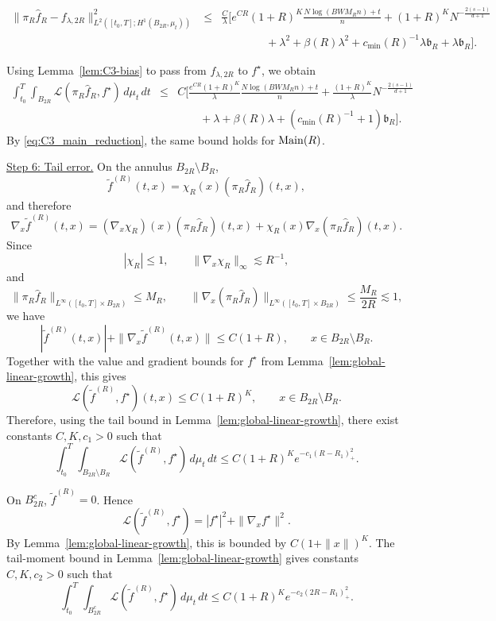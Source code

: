 \documentclass[11pt]{article}
\theoremstyle{plain}
\theoremstyle{definition}
\theoremstyle{remark}
\newcommand{\proofstep}[1]{\par\medskip\noindent\uline{#1}}
\begin{document}
\begin{eqnarray*}
\|\pi_R\widehat f_R-f_{\lambda,2R}\|_{L^2([t_0,T];H^1(B_{2R},\mu_t))}^2&\leq&
\frac{C}{\lambda}
\Big[
e^{CR}(1+R)^K\frac{N\log(BWM_Rn)+t}{n}
+
(1+R)^KN^{-\frac{2(s-1)}{d+1}}
\\
&&\qquad \qquad  +
\lambda^2+
\beta(R)\lambda^2
+
c_{\min}(R)^{-1}\lambda\mathfrak b_R
+
\lambda\mathfrak b_R
\Big].
\end{eqnarray*}

Using Lemma~\ref{lem:C3-bias} to pass from \(f_{\lambda,2R}\) to
\(f^\star\), we obtain
\begin{eqnarray}
\label{eq:C3_main_cylinder_bound_new}
\int_{t_0}^T\int_{B_{2R}}
\mathcal L(\pi_R\widehat f_R,f^\star)\,d\mu_t\,dt&\le&
C\Big[
\frac{e^{CR}(1+R)^K}{\lambda}
\frac{N\log(BWM_Rn)+t}{n}
+
\frac{(1+R)^K}{\lambda}
N^{-\frac{2(s-1)}{d+1}}\nonumber\\
&&\qquad +
\lambda
+
\beta(R)\lambda
+
(c_{\min}(R)^{-1}+1)\mathfrak b_R
\Big].
\end{eqnarray}
By \eqref{eq:C3_main_reduction}, the same bound holds for
\({\rm Main}(R)\).

\proofstep{Step 6: Tail error.}
On the annulus \(B_{2R}\setminus B_R\),
\[
\widetilde f^{(R)}(t,x)
=
\chi_R(x)(\pi_R\widehat f_R)(t,x),
\]
and therefore
\[
\nabla_x\widetilde f^{(R)}(t,x)
=
(\nabla_x\chi_R)(x)(\pi_R\widehat f_R)(t,x)
+
\chi_R(x)\nabla_x(\pi_R\widehat f_R)(t,x).
\]
Since
\[
|\chi_R|\le1,
\qquad
\|\nabla_x\chi_R\|_\infty\lesssim R^{-1},
\]
and
\[
\|\pi_R\widehat f_R\|_{L^\infty([t_0,T]\times B_{2R})}\le M_R,
\qquad
\|\nabla_x(\pi_R\widehat f_R)\|_{L^\infty([t_0,T]\times B_{2R})}
\le \frac{M_R}{2R}\lesssim1,
\]
we have
\[
|\widetilde f^{(R)}(t,x)|
+
\|\nabla_x\widetilde f^{(R)}(t,x)\|
\le
C(1+R),
\qquad
x\in B_{2R}\setminus B_R.
\]
Together with the value and gradient bounds for \(f^\star\) from
Lemma~\ref{lem:global-linear-growth}, this gives
\[
\mathcal L(\widetilde f^{(R)},f^\star)(t,x)
\le
C(1+R)^K,
\qquad
x\in B_{2R}\setminus B_R.
\]
Therefore, using the tail bound in Lemma~\ref{lem:global-linear-growth},
there exist constants \(C,K,c_1>0\) such that
\begin{equation}
\label{eq:C3_annulus_tail_bound}
\int_{t_0}^T\int_{B_{2R}\setminus B_R}
\mathcal L(\widetilde f^{(R)},f^\star)\,d\mu_t\,dt
\le
C(1+R)^K e^{-c_1(R-R_1)_+^2}.
\end{equation}

On \(B_{2R}^c\), \(\widetilde f^{(R)}=0\). Hence
\[
\mathcal L(\widetilde f^{(R)},f^\star)
=
|f^\star|^2+\|\nabla_xf^\star\|^2.
\]
By Lemma~\ref{lem:global-linear-growth}, this is bounded by
\(C(1+\|x\|)^K\). The tail-moment bound in
Lemma~\ref{lem:global-linear-growth} gives constants \(C,K,c_2>0\)
such that
\begin{equation}
\label{eq:C3_outer_tail_bound}
\int_{t_0}^T\int_{B_{2R}^c}
\mathcal L(\widetilde f^{(R)},f^\star)\,d\mu_t\,dt
\le
C(1+R)^K e^{-c_2(2R-R_1)_+^2}.
\end{equation}
\end{document}
